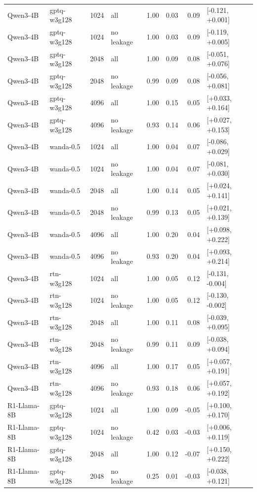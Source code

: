 \begin{tabular}{llrlrrrl}
Qwen3-4B & gptq-w3g128 & 1024 & all & 1.00 & 0.03 & 0.09 & [-0.121, +0.001] \\
Qwen3-4B & gptq-w3g128 & 1024 & no leakage & 1.00 & 0.03 & 0.09 & [-0.119, +0.005] \\
Qwen3-4B & gptq-w3g128 & 2048 & all & 1.00 & 0.09 & 0.08 & [-0.051, +0.076] \\
Qwen3-4B & gptq-w3g128 & 2048 & no leakage & 0.99 & 0.09 & 0.08 & [-0.056, +0.081] \\
Qwen3-4B & gptq-w3g128 & 4096 & all & 1.00 & 0.15 & 0.05 & [+0.033, +0.164] \\
Qwen3-4B & gptq-w3g128 & 4096 & no leakage & 0.93 & 0.14 & 0.06 & [+0.027, +0.153] \\
Qwen3-4B & wanda-0.5 & 1024 & all & 1.00 & 0.04 & 0.07 & [-0.086, +0.029] \\
Qwen3-4B & wanda-0.5 & 1024 & no leakage & 1.00 & 0.04 & 0.07 & [-0.081, +0.030] \\
Qwen3-4B & wanda-0.5 & 2048 & all & 1.00 & 0.14 & 0.05 & [+0.024, +0.141] \\
Qwen3-4B & wanda-0.5 & 2048 & no leakage & 0.99 & 0.13 & 0.05 & [+0.021, +0.139] \\
Qwen3-4B & wanda-0.5 & 4096 & all & 1.00 & 0.20 & 0.04 & [+0.098, +0.222] \\
Qwen3-4B & wanda-0.5 & 4096 & no leakage & 0.93 & 0.20 & 0.04 & [+0.093, +0.214] \\
Qwen3-4B & rtn-w3g128 & 1024 & all & 1.00 & 0.05 & 0.12 & [-0.131, -0.004] \\
Qwen3-4B & rtn-w3g128 & 1024 & no leakage & 1.00 & 0.05 & 0.12 & [-0.130, -0.002] \\
Qwen3-4B & rtn-w3g128 & 2048 & all & 1.00 & 0.11 & 0.08 & [-0.039, +0.095] \\
Qwen3-4B & rtn-w3g128 & 2048 & no leakage & 0.99 & 0.11 & 0.09 & [-0.038, +0.094] \\
Qwen3-4B & rtn-w3g128 & 4096 & all & 1.00 & 0.17 & 0.05 & [+0.057, +0.191] \\
Qwen3-4B & rtn-w3g128 & 4096 & no leakage & 0.93 & 0.18 & 0.06 & [+0.057, +0.192] \\
R1-Llama-8B & gptq-w3g128 & 1024 & all & 1.00 & 0.09 & -0.05 & [+0.100, +0.170] \\
R1-Llama-8B & gptq-w3g128 & 1024 & no leakage & 0.42 & 0.03 & -0.03 & [+0.006, +0.119] \\
R1-Llama-8B & gptq-w3g128 & 2048 & all & 1.00 & 0.12 & -0.07 & [+0.150, +0.222] \\
R1-Llama-8B & gptq-w3g128 & 2048 & no leakage & 0.25 & 0.01 & -0.03 & [-0.038, +0.121] \\

\end{tabular}

